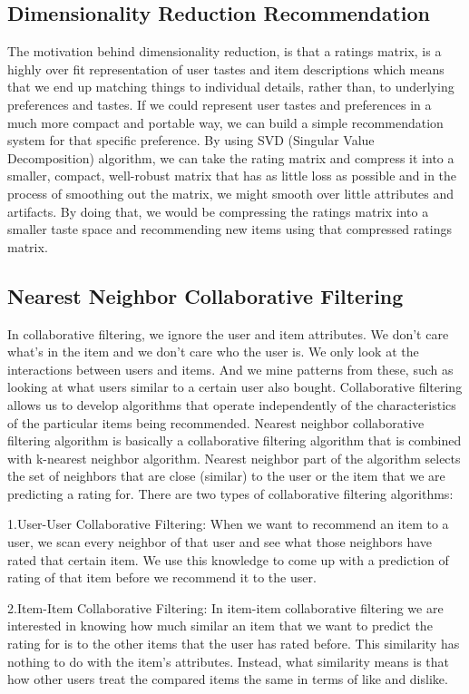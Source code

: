 \documentclass[12pt,a4paper]{report}
\begin{document}
\subsection{Dimensionality Reduction Recommendation}

The motivation behind dimensionality reduction, is that a ratings matrix, is a highly over fit representation of user tastes and item descriptions which means that we end up matching things to individual details, rather than, to underlying preferences and tastes. If we could represent user tastes and preferences in a much more compact and portable way, we can build a simple recommendation system for that specific preference. By using SVD (Singular Value Decomposition) algorithm, we can take the rating matrix and compress it into a smaller, compact, well-robust matrix that has as little loss as possible and in the process of smoothing out the matrix, we might smooth over little attributes and artifacts. By doing that, we would be compressing the ratings matrix into a smaller taste space and recommending new items using that compressed ratings matrix.


\subsection{Nearest Neighbor Collaborative Filtering}

In collaborative filtering, we ignore the user and item attributes. We don't care what's in the item and we don't care who the user is. We only look at the interactions between users and items. And we mine patterns from these, such as looking at what users similar to a certain user also bought. Collaborative filtering allows us to develop algorithms that operate independently of the characteristics of the particular items being recommended. Nearest neighbor collaborative filtering algorithm is basically a collaborative filtering algorithm that is combined with k-nearest neighbor algorithm. Nearest neighbor part of the algorithm selects the set of neighbors that are close (similar) to the user or the item that we are predicting a rating for. There are two types of collaborative filtering algorithms:

1.User-User Collaborative Filtering: When we want to recommend an item to a user, we scan every neighbor of that user and see what those neighbors have rated that certain item. We use this knowledge to come up with a prediction of rating of that item before we recommend it to the user.

2.Item-Item Collaborative Filtering: In item-item collaborative filtering we are interested in knowing how much similar an item that we want to predict the rating for is to the other items that the user has rated before. This similarity has nothing to do with the item's attributes. Instead, what similarity means is that how other users treat the compared items the same in terms of like and dislike.
\end{document}
